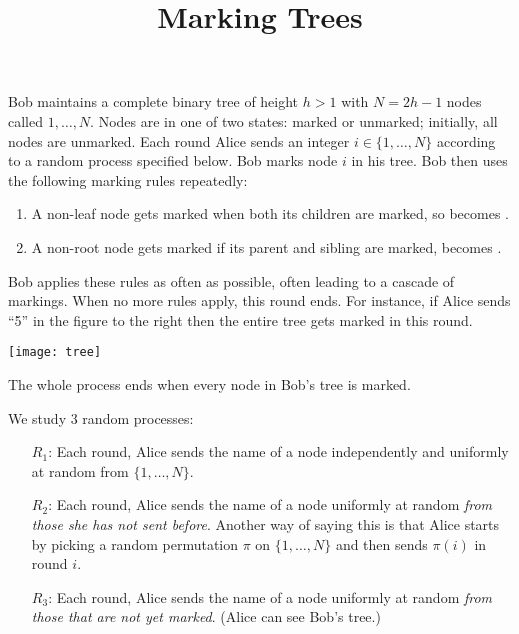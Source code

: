 \documentclass{tufte-handout}
\title{Marking Trees}
\date{}
\author{}
\begin{document}
\maketitle


Bob maintains a complete binary tree of height $h > 1$ with $N = 2h - 1$ nodes called $1, \ldots , N$. Nodes are in one of two states: marked or unmarked; initially, all nodes are unmarked. Each round Alice sends an integer $i \in \{1, \ldots , N\}$ according to a random process specified below. Bob marks node $i$ in his tree. Bob then uses the following marking rules repeatedly:


\begin{enumerate}
\item A non-leaf node gets marked when both its children are marked, so   becomes .
\item A non-root node gets marked if its parent and sibling are marked,  becomes .
\end{enumerate}


Bob applies these rules as often as possible, often leading to a cascade of markings.
When no more rules apply, this round ends. For instance, if Alice sends ``5'' in the figure to the right then the entire tree gets marked in this round.
\begin{marginfigure}\texttt{[image: tree]}\end{marginfigure}

The whole process ends when every node in Bob’s tree is marked. 

We study 3 random processes:
\begin{enumerate}
\item[$R_1$:] Each round, Alice sends the name of a node independently and uniformly at random from $\{1,\ldots , N\}$.
\item[$R_2$:] Each round, Alice sends the name of a node uniformly at random \emph{from those she has not sent before}. Another way of saying this is that Alice starts by picking a random permutation $\pi$ on $\{1,\ldots, N\}$ and then sends $\pi(i)$ in round $i$.
\item[$R_3$:] Each round, Alice sends the name of a node uniformly at random \emph{from those that are not yet marked}. (Alice can see Bob’s tree.)
\end{enumerate}
\end{document}
